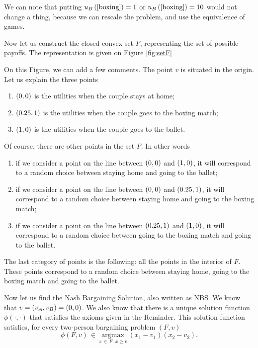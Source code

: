 \begin{enumerate} [label=\alph*.]
We can note that putting $u_{B} \left(\left[\text{boxing}\right]\right) = 1$ or $u_{B} \left(\left[\text{boxing}\right]\right) = 10$ would not change a thing, because we can rescale the problem, and use the equivalence of games.

Now let us construct the closed convex set $F$, representing the set of possible payoffs. The representation is given on Figure \ref{fig:setF}


	
	On this Figure, we can add a few comments. The point $v$ is situated in the origin. Let us explain the three points
	\begin{enumerate}
	    \item $\left(0,0\right)$ is the utilities when the couple stays at home;
	    \item $\left(0.25,1\right)$ is the utilities when the couple goes to the boxing match;
	    \item $\left(1,0\right)$ is the utilities when the couple goes to the ballet.
	\end{enumerate}
	
	Of course, there are other points in the set $F$. In other words
	\begin{enumerate}
	    \item if we consider a point on the line between $\left(0,0\right)$ and $\left(1,0\right)$, it will correspond to a random choice between staying home and going to the ballet;
	    \item if we consider a point on the line between $\left(0,0\right)$ and $\left(0.25,1\right)$, it will correspond to a random choice between staying home and going to the boxing match;
	    \item if we consider a point on the line between $\left(0.25,1\right)$ and $\left(1,0\right)$, it will correspond to a random choice between going to the boxing match and going to the ballet.
	\end{enumerate}
	
	The last category of points is the following: all the points in the interior of $F$. These points correspond to a random choice between staying home, going to the boxing match and going to the ballet.
	
	\vspace{5mm}
	
	Now let us find the Nash Bargaining Solution, also written as NBS. We know that $v = \left(v_{A}, v_{B}\right) = \left(0, 0\right)$. We also know that there is a unique solution function $\phi(\cdot, \cdot)$ that satisfies the axioms given in the Reminder. This solution function satisfies, for every two-person bargaining problem $(F, v)$
	\begin{equation*}
		\phi(F, v) \, \in \, \underset{x \, \in \, F, \, x \geq v}{\mathrm{argmax}} \ (x_1 - v_1)(x_2 - v_2).
	\end{equation*}
	

\end{enumerate}

